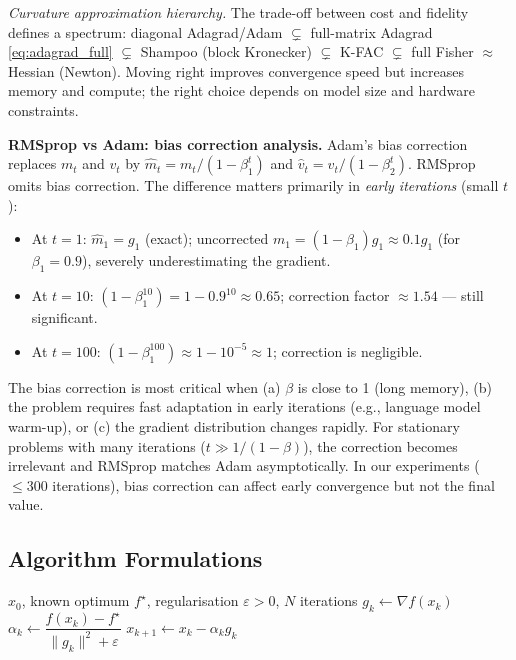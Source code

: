 \documentclass[11pt,a4paper]{article}
\theoremstyle{definition}
\begin{document}
\noindent\textit{Curvature approximation hierarchy.} The trade-off between cost and fidelity defines a spectrum: diagonal Adagrad/Adam $\subsetneq$ full-matrix Adagrad \eqref{eq:adagrad_full} $\subsetneq$ Shampoo (block Kronecker) $\subsetneq$ K-FAC $\subsetneq$ full Fisher $\approx$ Hessian (Newton). Moving right improves convergence speed but increases memory and compute; the right choice depends on model size and hardware constraints.

\noindent\textbf{RMSprop vs Adam: bias correction analysis.} Adam's bias correction replaces $m_t$ and $v_t$ by $\hat{m}_t = m_t/(1-\beta_1^t)$ and $\hat{v}_t = v_t/(1-\beta_2^t)$. RMSprop omits bias correction. The difference matters primarily in \emph{early iterations} (small $t$):
\begin{itemize}
\item At $t=1$: $\hat{m}_1 = g_1$ (exact); uncorrected $m_1 = (1-\beta_1)g_1 \approx 0.1 g_1$ (for $\beta_1 = 0.9$), severely underestimating the gradient.
\item At $t=10$: $(1-\beta_1^{10}) = 1 - 0.9^{10} \approx 0.65$; correction factor $\approx 1.54$ — still significant.
\item At $t=100$: $(1-\beta_1^{100}) \approx 1 - 10^{-5} \approx 1$; correction is negligible.
\end{itemize}
The bias correction is most critical when (a) $\beta$ is close to 1 (long memory), (b) the problem requires fast adaptation in early iterations (e.g., language model warm-up), or (c) the gradient distribution changes rapidly. For stationary problems with many iterations ($t \gg 1/(1-\beta)$), the correction becomes irrelevant and RMSprop matches Adam asymptotically. In our experiments ($\leq 300$ iterations), bias correction can affect early convergence but not the final value.

\subsection{Algorithm Formulations}

\begin{algorithm}[H]
\caption{Polyak Step Size}
\label{alg:polyak}
\begin{algorithmic}[1]
\Require $x_0$, known optimum $f^{\star}$, regularisation $\varepsilon > 0$, $N$ iterations
    \State $g_k \gets \nabla f(x_k)$
    \State $\alpha_k \gets \dfrac{f(x_k) - f^{\star}}{\|g_k\|^2 + \varepsilon}$ 
    \State $x_{k+1} \gets x_k - \alpha_k g_k$
\EndFor
\end{algorithmic}
\end{algorithm}
\end{document}

